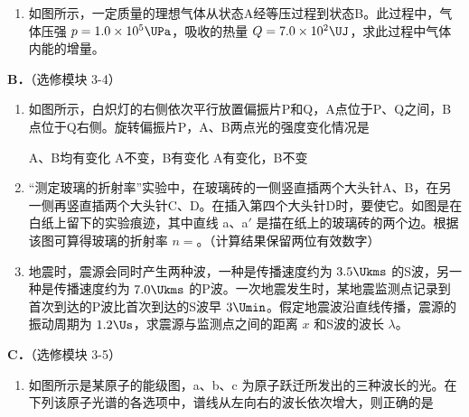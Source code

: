 \documentclass[\gkver]{gaokaozhenti}
\begin{document}
\begin{enumerate}
\begin{enumerate}
	\item
	如图所示，一定质量的理想气体从状态A经等压过程到状态B。此过程中，气体压强 $p=1.0\times10^{5}\UPa$，吸收的热量 $Q=7.0\times10^{2}\UJ$，求此过程中气体内能的增量。
	
\end{enumerate}

\textbf{B．}（选修模块 3-4）

\begin{enumerate}
	\item
	如图所示，白炽灯的右侧依次平行放置偏振片P和Q，A点位于P、Q之间，B点位于Q右侧。旋转偏振片P，A、B两点光的强度变化情况是
	
	
	{A、B均有变化}
	{A不变，B有变化}
	{A有变化，B不变}
	\item
	“测定玻璃的折射率”实验中，在玻璃砖的一侧竖直插两个大头针A、B，在另一侧再竖直插两个大头针C、D。在插入第四个大头针D时，要使它。如图是在白纸上留下的实验痕迹，其中直线 a、a$'$ 是描在纸上的玻璃砖的两个边。根据该图可算得玻璃的折射率 $n=$。（计算结果保留两位有效数字）
	
	\item
	地震时，震源会同时产生两种波，一种是传播速度约为 $3.5\Ukms$ 的S波，另一种是传播速度约为 $7.0\Ukms$ 的P波。一次地震发生时，某地震监测点记录到首次到达的P波比首次到达的S波早 $3\Umin$。假定地震波沿直线传播，震源的振动周期为 $1.2\Us$，求震源与监测点之间的距离 $x$ 和S波的波长 $\lambda$。
\end{enumerate}

\textbf{C．}（选修模块 3-5）

\begin{enumerate}
	\item
	如图所示是某原子的能级图，a、b、c 为原子跃迁所发出的三种波长的光。在下列该原子光谱的各选项中，谱线从左向右的波长依次增大，则正确的是
	
	

\end{enumerate}
\end{enumerate}
\end{document}
